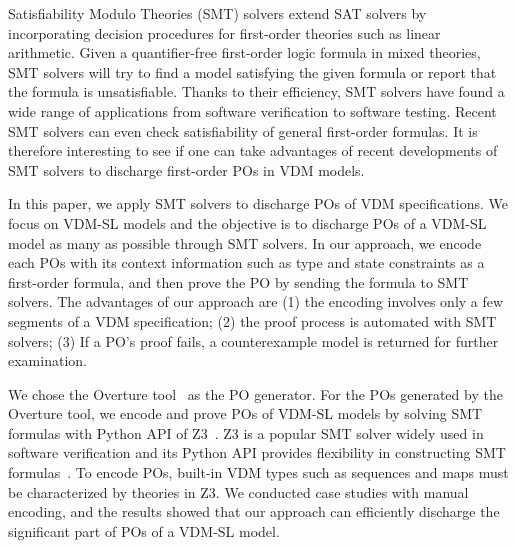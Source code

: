 Satisfiability Modulo Theories (SMT) solvers extend SAT solvers by incorporating decision procedures for first-order theories such as linear arithmetic. Given a quantifier-free first-order logic formula in mixed theories, SMT solvers will try to find a model satisfying the given formula or report that the formula is unsatisfiable. Thanks to their efficiency, SMT solvers have found a wide range of applications from software verification to software testing. Recent SMT solvers can even check satisfiability of general first-order formulas. It is therefore interesting to see if one can take advantages of recent developments of SMT solvers to discharge first-order POs in VDM models. 


In this paper, we apply SMT solvers to discharge POs of VDM specifications. We focus on VDM-SL models and the objective is to discharge POs of a VDM-SL model as many as possible through SMT solvers. In our approach, we encode each POs with its context information such as type and state constraints as a first-order formula, and then prove the PO by sending the formula to SMT solvers. The advantages of our approach are (1) the encoding involves only a few segments of a VDM specification; (2) the proof process is automated with SMT solvers; (3) If a PO's proof fails, a counterexample model is returned for further examination. 

We chose the Overture tool~\cite{Larsen:2010:OII:1668862.1668864} as the PO generator. For the POs generated by the Overture tool, we encode and prove POs of VDM-SL models by solving SMT formulas with Python API of Z3~\cite{MB:08:ZSS}. Z3 is a popular SMT solver widely used in software verification and its Python API provides flexibility in constructing SMT formulas~\cite{BarFT-SMTLIB}. To encode POs, built-in VDM types such as sequences and maps must be characterized by theories in Z3. We conducted case studies with manual encoding, and the results showed that our approach can efficiently discharge the significant part of POs of a VDM-SL model.


